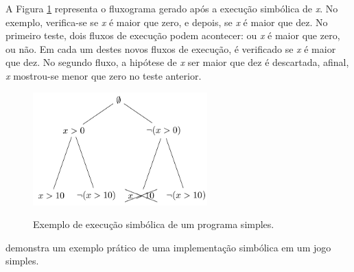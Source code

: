 A Figura \ref{fig:exsimb} representa o fluxograma gerado após a execução simbólica de \textit{x}. No exemplo, verifica-se se \textit{x} é maior que zero, e depois, se \textit{x} é maior que dez. No primeiro teste, dois fluxos de execução podem acontecer: ou \textit{x} é maior que zero, ou não. Em cada um destes novos fluxos de execução, é verificado se \textit{x} é maior que dez. No segundo fluxo, a hipótese de \textit{x} ser maior que dez é descartada, afinal, \textit{x} mostrou-se menor que zero no teste anterior.  

\begin{figure}
	\begin{center}
		\includegraphics[width=0.6\textwidth]{imagens/exemplosimbolic.png}
		
		\caption[Exemplo de execução simbólica de um programa simples.]{Exemplo de execução simbólica de um programa simples.}
		\label{fig:exsimb}	
	\end{center}

\end{figure}


 \cite{implementacaosimbolica} demonstra um exemplo prático de uma implementação simbólica em um jogo simples.


